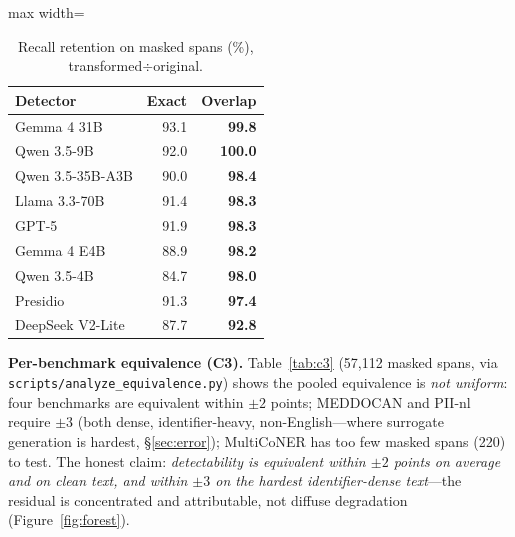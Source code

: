 \documentclass[11pt]{article}
\newcommand{\tp}[1]{\texttt{#1}}
\begin{document}
\begin{table}[t]\centering\small
\begin{adjustbox}{max width=\columnwidth}%
\begin{tabular}{lrr}
\toprule
Detector & Exact & Overlap\\
\midrule
Gemma 4 31B & 93.1 & \textbf{99.8}\\
Qwen 3.5-9B & 92.0 & \textbf{100.0}\\
Qwen 3.5-35B-A3B & 90.0 & \textbf{98.4}\\
Llama 3.3-70B & 91.4 & \textbf{98.3}\\
GPT-5 & 91.9 & \textbf{98.3}\\
Gemma 4 E4B & 88.9 & \textbf{98.2}\\
Qwen 3.5-4B & 84.7 & \textbf{98.0}\\
Presidio & 91.3 & \textbf{97.4}\\
DeepSeek V2-Lite & 87.7 & \textbf{92.8}\\
\bottomrule
\end{tabular}
\end{adjustbox}
\caption{Recall retention on masked spans (\%), transformed$\div$original.}\label{tab:ret}
\end{table}

\textbf{Per-benchmark equivalence (C3).} Table~\ref{tab:c3} (57{,}112 masked spans, via \tp{scripts/analyze\_equivalence.py}) shows the pooled equivalence is \emph{not uniform}: four benchmarks are equivalent within $\pm2$ points; MEDDOCAN and PII-nl require $\pm3$ (both dense, identifier-heavy, non-English---where surrogate generation is hardest, \S\ref{sec:error}); MultiCoNER has too few masked spans (220) to test. The honest claim: \emph{detectability is equivalent within $\pm2$ points on average and on clean text, and within $\pm3$ on the hardest identifier-dense text}---the residual is concentrated and attributable, not diffuse degradation (Figure~\ref{fig:forest}).
\end{document}
